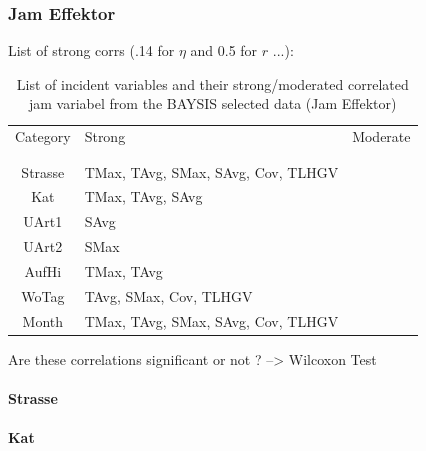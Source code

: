 \documentclass[a4paper,headsepline,footsepline,fontsize=11pt,BCOR=12mm,DIV=12]{report}
\begin{document}
\subsubsection{Jam Effektor}

List of strong corrs (.14 for $\eta$ and 0.5 for $r$ ...):

\noindent
\begin{table}[h!]
	\centering
	\begin{tabular}{c|l|l}  
		Category & Strong & Moderate \\
		\\[-1em]
		\hline
		\\[-1em]
		Strasse & TMax, TAvg, SMax, SAvg, Cov, TLHGV & \\ 
 		Kat & TMax, TAvg, SAvg & \\ 
 		UArt1 & SAvg & \\
 		UArt2 & SMax & \\
 		AufHi & TMax, TAvg & \\
 		WoTag & TAvg, SMax, Cov, TLHGV & \\
 		Month & TMax, TAvg, SMax, SAvg, Cov, TLHGV & \\
	\end{tabular}
	\caption{List of incident variables and their strong/moderated correlated jam variabel from the BAYSIS selected data (Jam Effektor)}
\end{table}

Are these correlations significant or not ? --> Wilcoxon Test

\paragraph{Strasse}

\paragraph{Kat}
\end{document}
